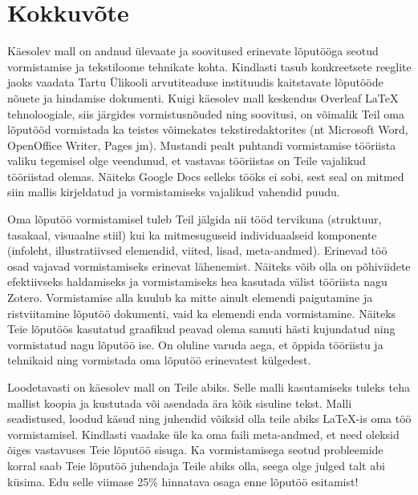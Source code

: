 \section{Kokkuvõte} \label{kokkuvõte}
Käesolev mall on andnud ülevaate ja soovitused erinevate lõputööga seotud vormistamise ja tekstiloome tehnikate kohta. Kindlasti tasub konkreetsete reeglite jaoks vaadata Tartu Ülikooli arvutiteaduse instituudis kaitstavate lõputööde nõuete ja hindamise dokumenti. Kuigi käesolev mall keskendus Overleaf LaTeX tehnoloogiale, siis järgides vormistusnõuded ning soovitusi, on võimalik Teil oma lõputööd vormistada ka teistes võimekates tekstiredaktorites (nt Microsoft Word, OpenOffice Writer, Pages jm). Mustandi pealt puhtandi vormistamise tööriista valiku tegemisel olge veendunud, et vastavas tööriistas on Teile vajalikud tööriistad olemas. Näiteks Google Docs selleks tööks ei sobi, sest seal on mitmed siin mallis kirjeldatud ja vormistamiseks vajalikud vahendid puudu.

Oma lõputöö vormistamisel tuleb Teil jälgida nii tööd tervikuna (struktuur, tasakaal, visuaalne stiil) kui ka mitmesuguseid individuaalseid komponente (infoleht, illustratiivsed elemendid, viited, lisad, meta-andmed). Erinevad töö osad vajavad vormistamiseks erinevat lähenemist. Näiteks võib olla on põhiviidete efektiivseks haldamiseks ja vormistamiseks hea kasutada välist tööriista nagu Zotero. Vormistamise alla kuulub ka mitte ainult elemendi paigutamine ja ristviitamine lõputöö dokumenti, vaid ka elemendi enda vormistamine. Näiteks Teie lõputöös kasutatud graafikud peavad olema samuti hästi kujundatud ning vormistatud nagu lõputöö ise. On oluline varuda aega, et õppida tööriistu ja tehnikaid ning vormistada oma lõputöö erinevatest külgedest.

Loodetavasti on käesolev mall on Teile abiks. Selle malli kasutamiseks tuleks teha mallist koopia ja kustutada või asendada ära kõik sisuline tekst. Malli seadistused, loodud käsud ning juhendid võiksid olla teile abiks LaTeX-is oma töö vormistamisel. Kindlasti vaadake üle ka oma faili meta-andmed, et need oleksid õiges vastavuses Teie lõputöö sisuga. Ka vormistamisega seotud probleemide korral saab Teie lõputöö juhendaja Teile abiks olla, seega olge julged talt abi küsima. Edu selle viimase 25\% hinnatava osaga enne lõputöö esitamist!
